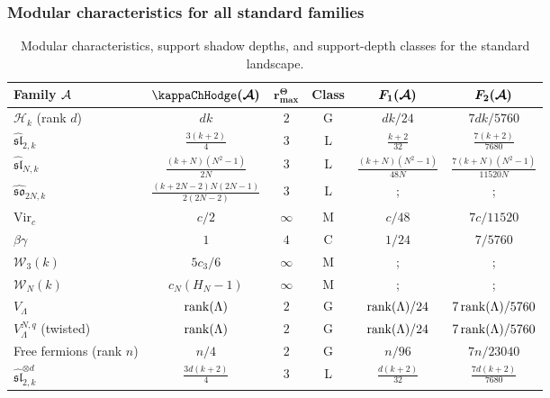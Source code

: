 \subsubsection{Modular characteristics for all standard families}

\begin{table}[ht]
\centering
\caption{Modular characteristics, support shadow depths, and support-depth classes for the standard landscape.}
\renewcommand{\arraystretch}{1.4}
{\footnotesize
\begin{tabular}{|l|c|c|c|c|c|}
\hline
\textbf{Family $\mathcal{A}$} & $\boldsymbol{\kappaChHodge(\cA)}$ & $\boldsymbol{r^\Theta_{\max}}$ & \textbf{Class} & $\boldsymbol{F_1(\mathcal{A})}$ & $\boldsymbol{F_2(\mathcal{A})}$ \\
\hline
$\mathcal{H}_k$ (rank $d$) & $dk$ & $2$ & G & $dk/24$ & $7dk/5760$ \\
\hline
$\widehat{\mathfrak{sl}}_{2,k}$ & $\frac{3(k+2)}{4}$ & $3$ & L & $\frac{k+2}{32}$ & $\frac{7(k+2)}{7680}$ \\
\hline
$\widehat{\mathfrak{sl}}_{N,k}$ & $\frac{(k+N)(N^2-1)}{2N}$ & $3$ & L & $\frac{(k+N)(N^2-1)}{48N}$ & $\frac{7(k+N)(N^2-1)}{11520N}$ \\
\hline
$\widehat{\mathfrak{so}}_{2N,k}$ & $\frac{(k+2N-2)N(2N-1)}{2(2N-2)}$ & $3$ & L &; &; \\
\hline
$\mathrm{Vir}_c$ & $c/2$ & $\infty$ & M & $c/48$ & $7c/11520$ \\
\hline
$\beta\gamma$ & $1$ & $4$ & C & $1/24$ & $7/5760$ \\
\hline
$\mathcal{W}_3(k)$ & $5c_3/6$ & $\infty$ & M &; &; \\
\hline
$\mathcal{W}_N(k)$ & $c_N(H_N - 1)$ & $\infty$ & M &; &; \\
\hline
$V_\Lambda$ & $\operatorname{rank}(\Lambda)$ & $2$ & G & $\operatorname{rank}(\Lambda)/24$ & $7\operatorname{rank}(\Lambda)/5760$ \\
\hline
$V_\Lambda^{N,q}$ (twisted) & $\operatorname{rank}(\Lambda)$ & $2$ & G & $\operatorname{rank}(\Lambda)/24$ & $7\operatorname{rank}(\Lambda)/5760$ \\
\hline
Free fermions (rank $n$) & $n/4$ & $2$ & G & $n/96$ & $7n/23040$ \\
\hline
$\widehat{\mathfrak{sl}}_{2,k}^{\otimes d}$ & $\frac{3d(k+2)}{4}$ & $3$ & L & $\frac{d(k+2)}{32}$ & $\frac{7d(k+2)}{7680}$ \\
\hline
\end{tabular}}
\end{table}

